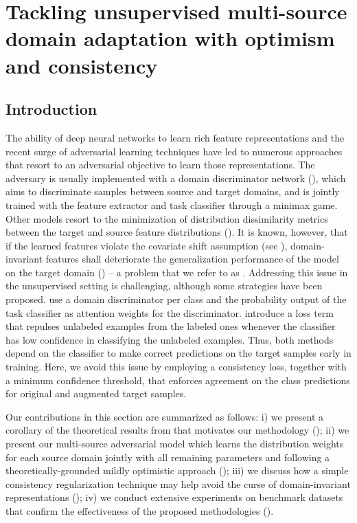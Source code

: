 \section{Tackling unsupervised multi-source domain adaptation with optimism and consistency}
\label{sec:modafm}

\subsection{Introduction}
\label{sec:modafm_intro}
The ability of deep neural networks to learn rich feature representations and the recent surge of adversarial learning techniques have led to numerous approaches that resort to an adversarial objective to learn those representations. The adversary is usually implemented with a domain discriminator network (\citet{Ganin2015}), which aims to discriminate samples between source and target domains, and is jointly trained with the feature extractor and task classifier through a minimax game. Other models resort to the minimization of  distribution dissimilarity metrics between the target and source feature distributions (\citet{DeSIRe, Guo2018}). It is known, however, that if the learned features violate the covariate shift assumption (see ), domain-invariant features shall deteriorate the generalization performance of the model on the target domain (\citet{Zhao2019}) -- a problem that we refer to as . Addressing this issue in the unsupervised setting is challenging, although some strategies have been proposed. \citet{Pei2018} use a domain discriminator per class and the probability output of the task classifier as attention weights for the discriminator. \citet{Sebag2019} introduce a loss term that repulses unlabeled examples from the labeled ones whenever the classifier has low confidence in classifying the unlabeled examples. Thus, both methods depend on the classifier to make correct predictions on the target samples early in training. Here, we avoid this issue by employing a consistency loss, together with a minimum confidence threshold, that enforces agreement on the class predictions for original and augmented target samples.

Our contributions in this section are summarized as follows: i) we present a corollary of the theoretical results from \citet{BenDavid2010} that motivates our methodology (); ii) we present our multi-source adversarial model which learns the distribution weights for each source domain jointly with all remaining parameters and following a theoretically-grounded mildly optimistic approach (); iii) we discuss how a simple consistency regularization technique may help avoid the curse of domain-invariant representations (); iv) we conduct extensive experiments on benchmark datasets that confirm the effectiveness of the proposed methodologies ().


